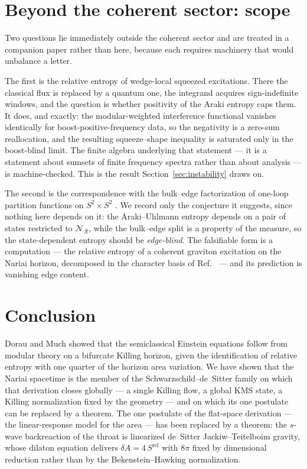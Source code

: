 \documentclass[11pt]{article}
\newcommand{\Srel}{S^{\mathrm{rel}}}
\newcommand{\Nariai}{Nariai}
\begin{document}

\section{Beyond the coherent sector: scope}
\label{sec:scope}

Two questions lie immediately outside the coherent sector and are treated in a companion paper \cite{SuppNariai} rather than here, because each requires machinery that would unbalance a letter.

The first is the relative entropy of wedge-local squeezed excitations. There the classical flux is replaced by a quantum one, the integrand acquires sign-indefinite windows, and the question is whether positivity of the Araki entropy caps them. It does, and exactly: the modular-weighted interference functional vanishes identically for boost-positive-frequency data, so the negativity is a zero-sum reallocation, and the resulting squeeze--shape inequality is saturated only in the boost-blind limit. The finite algebra underlying that statement --- it is a statement about sumsets of finite frequency spectra rather than about analysis --- is machine-checked. This is the result Section~\ref{sec:instability} draws on.

The second is the correspondence with the bulk--edge factorization of one-loop partition functions on $S^2 \times S^2$ \cite{LawLochabPRL,LawLochabPRD}. We record only the conjecture it suggests, since nothing here depends on it: the Araki--Uhlmann entropy depends on a pair of states restricted to $\mathscr{N}_{\mathcal{R}}$, while the bulk--edge split is a property of the measure, so the state-dependent entropy should be \emph{edge-blind}. The falsifiable form is a computation --- the relative entropy of a coherent graviton excitation on the \Nariai{} horizon, decomposed in the character basis of Ref.~\cite{Mukherjee} --- and its prediction is vanishing edge content.

\section{Conclusion}
\label{sec:conclusion}

Dorau and Much showed that the semiclassical Einstein equations follow from modular theory on a bifurcate Killing horizon, given the identification of relative entropy with one quarter of the horizon area variation. We have shown that the \Nariai{} spacetime is the member of the Schwarzschild--de~Sitter family on which that derivation closes globally --- a single Killing flow, a global KMS state, a Killing normalization fixed by the geometry --- and on which its one postulate can be replaced by a theorem. The one postulate of the flat-space derivation --- the linear-response model for the area --- has been replaced by a theorem: the $s$-wave backreaction of the throat is linearized de~Sitter Jackiw--Teitelboim gravity, whose dilaton equation delivers $\delta A = 4\,\Srel$ with $8\pi$ fixed by dimensional reduction rather than by the Bekenstein--Hawking normalization.
\end{document}
